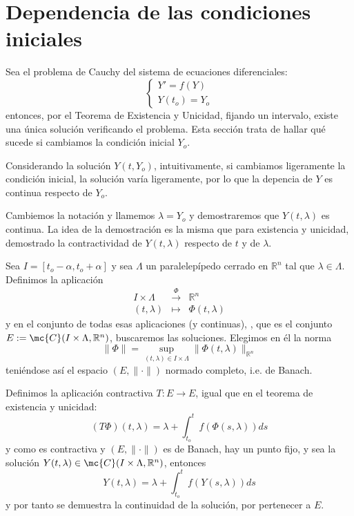 \section{Dependencia de las condiciones iniciales}

Sea el problema de Cauchy del sistema de ecuaciones diferenciales:
$$\left\{ \begin{array}{l}
     Y'=f(Y)  \\
     Y(t_o)=Y_o
\end{array}\right.$$
entonces, por el Teorema de Existencia y Unicidad, fijando un intervalo, existe una única solución verificando el problema. Esta sección trata de hallar qué sucede si cambiamos la condición inicial $Y_o$. 
\begin{teo}
Considerando la solución $Y(t,Y_o)$, intuitivamente, si cambiamos ligeramente la condición inicial, la solución varía ligeramente, por lo que la depencia de $Y$ es continua respecto de $Y_o$.
\end{teo}
\begin{dem}
    Cambiemos la notación y llamemos $\lambda=Y_o$ y demostraremos que $Y(t,\lambda)$ es continua. La idea de la demostración es la misma que para existencia y unicidad, demostrado la contractividad de $Y(t,\lambda)$ respecto de $t$ y de $\lambda$. 

    Sea $I=[t_o-\alpha, t_o+\alpha]$ y sea $\Lambda$ un paralelepípedo cerrado en $\mathbb R^n$ tal que $\lambda \in \Lambda$. Definimos la aplicación
    $$\begin{array}{rcl}
         I \times \Lambda & \overset{\Phi}{\longrightarrow} & \mathbb R^n  \\
         (t, \lambda) & \longmapsto & \Phi(t,\lambda) 
    \end{array}$$
    y en el conjunto de todas esas aplicaciones (y continuas), , que es el conjunto $E:=\mc{C}(I \times \Lambda, \mathbb R^n)$, buscaremos las soluciones. Elegimos en él la norma 
    $$\|\Phi\|=\sup_{(t,\lambda) \in I \times \Lambda}\|\Phi(t,\lambda)\|_{\mathbb R^n}$$
    teniéndose así el espacio $(E,\|\cdot\|)$ normado completo, i.e. de Banach. 

    Definimos la aplicación contractiva $T: E \longrightarrow E$, igual que en el teorema de existencia y unicidad:
    $$(T\Phi)(t,\lambda)=\lambda + \int_{t_o}^t f(\Phi(s,\lambda))ds$$
    y como es contractiva y $(E, \|\cdot \|)$ es de Banach, hay un punto fijo, y sea la solución $Y(t,\lambda) \in \mc{C}(I \times \Lambda, \mathbb R^n)$, entonces 
    $$Y(t,\lambda )=\lambda + \int_{t_o}^t f(Y(s, \lambda)) ds$$
    y por tanto se demuestra la continuidad de la solución, por pertenecer a $E$.
\end{dem}
